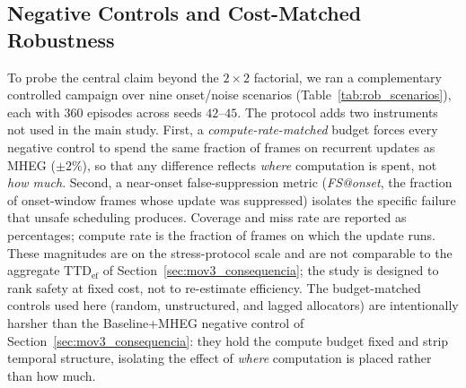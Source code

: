 \subsection{Negative Controls and Cost-Matched Robustness}
\label{sec:robustness_controls}

To probe the central claim beyond the $2{\times}2$ factorial, we ran a
complementary controlled campaign over nine onset/noise scenarios
(Table~\ref{tab:rob_scenarios}), each with $360$ episodes across seeds
$42$--$45$. The protocol adds two instruments not used in the main study.
First, a \emph{compute-rate-matched} budget forces every negative control to
spend the same fraction of frames on recurrent updates as \mbox{MHEG}
($\pm 2\%$), so that any difference reflects \emph{where} computation is
spent, not \emph{how much}. Second, a near-onset false-suppression metric
(\emph{FS@onset}, the fraction of onset-window frames whose update was
suppressed) isolates the specific failure that unsafe scheduling produces.
Coverage and miss rate are reported as percentages; compute rate is the
fraction of frames on which the update runs. These magnitudes are on the
stress-protocol scale and are not comparable to the aggregate
$\mathrm{TTD}_{\mathrm{ef}}$ of Section~\ref{sec:mov3_consequencia}; the study
is designed to rank safety at fixed cost, not to re-estimate efficiency.
The budget-matched controls used here (random, unstructured, and lagged
allocators) are intentionally harsher than the Baseline+MHEG negative control
of Section~\ref{sec:mov3_consequencia}: they hold the compute budget fixed and
strip temporal structure, isolating the effect of \emph{where} computation is
placed rather than how much.

